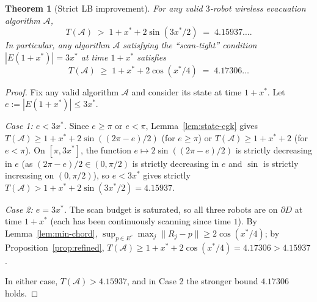\documentclass[11pt]{article}
\theoremstyle{plain}
\newtheorem{theorem}{Theorem}
\theoremstyle{definition}
\theoremstyle{remark}
\begin{document}
\begin{theorem}[Strict LB improvement]
\label{thm:lb-strict}
For any valid $3$-robot wireless evacuation algorithm $\mathcal A$,
\[
T(\mathcal A) \;>\; 1 + x^* + 2\sin(3x^*/2) \;=\; 4.15937\ldots.
\]
In particular, any algorithm $\mathcal A$ satisfying the ``scan-tight''
condition $|E(1 + x^*)| = 3x^*$ at time $1 + x^*$ satisfies
\[
T(\mathcal A) \;\ge\; 1 + x^* + 2\cos(x^*/4) \;=\; 4.17306\ldots
\]
\end{theorem}

\begin{proof}
Fix any valid algorithm $\mathcal A$ and consider its state at time
$1 + x^*$. Let $e := |E(1 + x^*)| \le 3x^*$.

\emph{Case 1: $e < 3x^*$.} Since $e \ge \pi$ or $e < \pi$,
Lemma~\ref{lem:state-cgk} gives $T(\mathcal A) \ge 1 + x^* + 2\sin
((2\pi - e)/2)$ (for $e \ge \pi$) or $T(\mathcal A) \ge 1 + x^* + 2$
(for $e < \pi$). On $[\pi, 3x^*]$, the function $e \mapsto 2\sin((2\pi
- e)/2)$ is strictly decreasing in $e$ (as $(2\pi - e)/2 \in (0, \pi/2)$
is strictly decreasing in $e$ and $\sin$ is strictly increasing on
$(0, \pi/2)$), so $e < 3x^*$ gives strictly $T(\mathcal A) > 1 + x^* +
2\sin(3x^*/2) = 4.15937$.

\emph{Case 2: $e = 3x^*$.} The scan budget is saturated, so all three
robots are on $\partial D$ at time $1 + x^*$ (each has been continuously
scanning since time $1$). By Lemma~\ref{lem:min-chord},
$\sup_{p \in E^c} \max_j \|R_j - p\| \ge 2\cos(x^*/4)$; by
Proposition~\ref{prop:refined}, $T(\mathcal A) \ge 1 + x^* + 2\cos(x^*/4)
= 4.17306 > 4.15937$.

In either case, $T(\mathcal A) > 4.15937$, and in Case 2 the stronger
bound $4.17306$ holds.
\end{proof}
\end{document}
